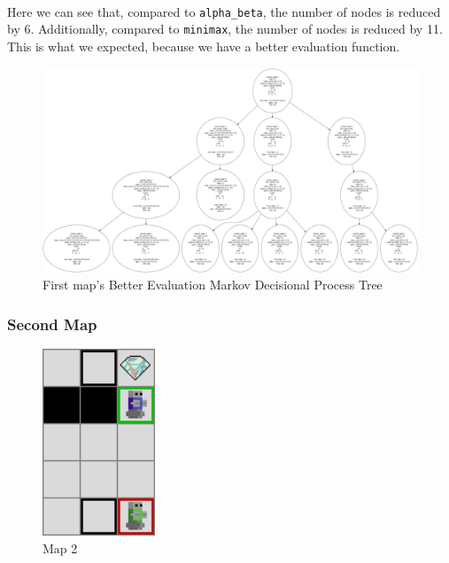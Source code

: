 \documentclass{article}
\begin{document}
    
\paragraph{}
Here we can see that, compared to \texttt{alpha\_beta}, 
the number of nodes is reduced by 6. 
Additionally, compared to \texttt{minimax}, 
the number of nodes is reduced by 11. 
This is what we expected, because we have a better evaluation function.

\begin{figure}[h]
    \centering
    \includegraphics[width=\textwidth]{media/20231029-134819.png}
    \caption{First map's Better Evaluation Markov Decisional Process Tree}
    \label{fig:image1tree}
\end{figure}
\vspace{1em}


\newpage
\newpage
\subsubsection{Second Map}

\begin{figure}
    \centering
    \includegraphics[width=0.3\textwidth]{media/map/map2023_10_29_13_56_42.png}
    \caption{Map 2}
    \label{fig:image2}
\end{figure}
    
\end{document}
